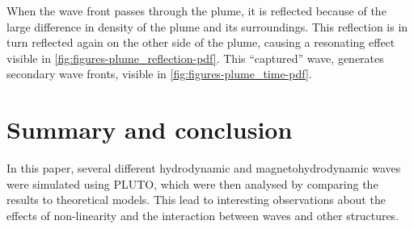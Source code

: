 \documentclass[a4paper]{article}
\numberwithin{figure}{section}
\numberwithin{equation}{section}
\begin{document}
When the wave front passes through the plume, it is reflected because of the large difference in density of the plume and its surroundings. This reflection is in turn reflected again on the other side of the plume, causing a resonating effect visible in \cref{fig:figures-plume_reflection-pdf}. This ``captured'' wave, generates secondary wave fronts, visible in \cref{fig:figures-plume_time-pdf}.
\section{Summary and conclusion}
In this paper, several different hydrodynamic and magnetohydrodynamic waves were simulated using PLUTO, which were then analysed by comparing the results to theoretical models. This lead to interesting observations about the effects of non-linearity and the interaction between waves and other structures. 
\printbibliography
\end{document}
